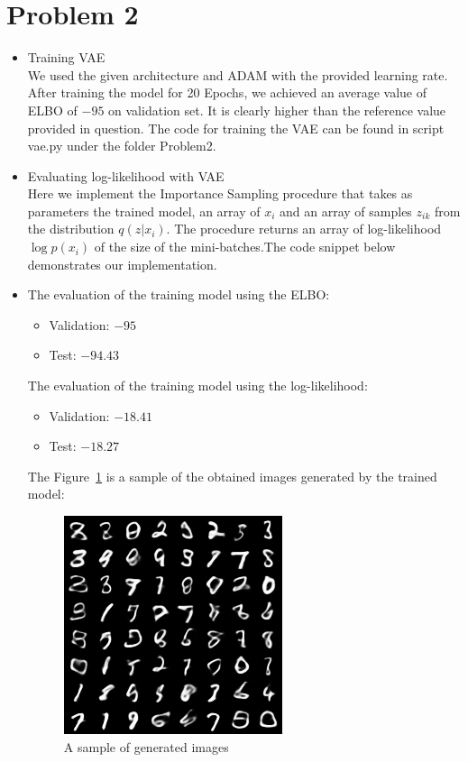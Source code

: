 \section*{Problem 2}
\begin{itemize}
     \item[A.]{Training VAE}\\
     We used the given architecture and ADAM with the provided learning rate. After training the model for 20 Epochs, we achieved an average value of ELBO of $-95$ on validation set. It is clearly higher than the reference value provided in question. The code for training the VAE  can be found in script vae.py under the folder Problem2.
     
     \item[B.1]{Evaluating log-likelihood with VAE}\\
     Here we implement the Importance Sampling procedure that takes as parameters the trained model, an array of $x_i$ and an array of samples $z_{ik}$ from the distribution $q(z|x_i)$. The procedure returns an array of log-likelihood $\log p(x_i)$  of the size of the mini-batches.The code snippet below demonstrates our implementation. 
     
     
     
     \item[B.2]
     The evaluation of the training model using the ELBO:
     \begin{itemize}
         \item [a.] Validation: $-95$
         \item [b.] Test: $-94.43$
     \end{itemize}
     The evaluation of the training model using the log-likelihood:
     \begin{itemize}
         \item [a.] Validation: $-18.41$
         \item [b.] Test: $-18.27$
     \end{itemize}
     The Figure~\ref{fig:gen_sample} is a sample of the obtained images generated by the trained model:
\begin{figure}[H]
\centering
  \includegraphics[scale=0.8]{sample_19.png}
  \caption{A sample of generated images}
  \label{fig:gen_sample}
\end{figure}
\end{itemize}
